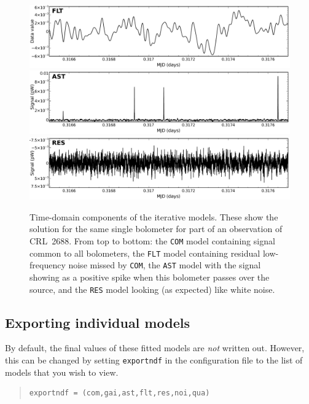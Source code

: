 \documentclass[twoside,11pt]{article}
\newcommand{\xlabel}[1]{}
\renewcommand{\_}{\texttt{\symbol{95}}}
\newenvironment{myquote}{\begin{quote}\begin{small}}{\end{small}\end{quote}}
\begin{document}
\begin{figure}
\begin{center}
\begin{htmlonly}
  \includegraphics[width=136mm]{sc21_flt} \\
  \includegraphics[width=136mm]{sc21_ast} \\
  \includegraphics[width=136mm]{sc21_res} \\
\end{htmlonly}
\caption[Iterative models in the time domain]{\small Time-domain
components of the iterative models. These show the solution for the
same single bolometer for part of an observation of CRL~2688. From top
to bottom: the \texttt{COM} model containing signal common to all
bolometers, the \texttt{FLT} model containing residual low-frequency
noise missed by \texttt{COM}, the \texttt{AST} model with the signal
showing as a positive spike when this bolometer passes over the
source, and the \texttt{RES} model looking (as expected) like white
noise.}
\label{fig:itercomp}
\end{center}
\end{figure}


\subsection{\xlabel{export}Exporting individual models}
\label{sec:export}

By default, the final values of these fitted models are \emph{not}
written out. However, this can be changed by setting
\texttt{exportndf} in the configuration file to the list of models
that you wish to view.
\vspace{0cm}
\begin{myquote}
\begin{verbatim}
exportndf = (com,gai,ast,flt,res,noi,qua)
\end{verbatim}
\end{myquote}
\end{document}
